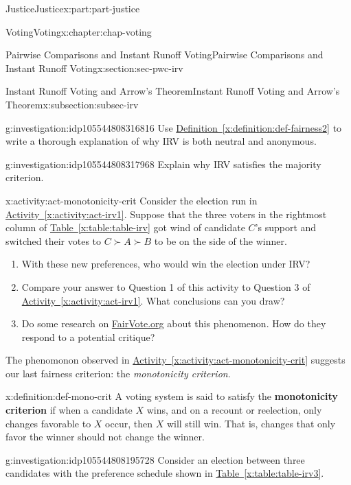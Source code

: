 \documentclass[oneside,10pt,]{book}
\newcommand{\xreffont}{\relax}
\newcommand{\terminology}[1]{\textbf{#1}}
\numberwithin{equation}{section}
\begin{document}
\begin{partptx}{Justice}{}{Justice}{}{}{x:part:part-justice}
\begin{chapterptx}{Voting}{}{Voting}{}{}{x:chapter:chap-voting}
\begin{sectionptx}{Pairwise Comparisons and Instant Runoff Voting}{}{Pairwise Comparisons and Instant Runoff Voting}{}{}{x:section:sec-pwc-irv}
\begin{subsectionptx}{Instant Runoff Voting and Arrow's Theorem}{}{Instant Runoff Voting and Arrow's Theorem}{}{}{x:subsection:subsec-irv}
\begin{investigation}{}{g:investigation:idp105544808316816}
Use \hyperref[x:definition:def-fairness2]{Definition~{\xreffont\ref{x:definition:def-fairness2}}} to write a thorough explanation of why IRV is both neutral and anonymous.%
\end{investigation}%
\begin{investigation}{}{g:investigation:idp105544808317968}%
Explain why IRV satisfies the majority criterion.%
\end{investigation}%
\begin{activity}{}{x:activity:act-monotonicity-crit}%
Consider the election run in \hyperref[x:activity:act-irv1]{Activity~{\xreffont\ref{x:activity:act-irv1}}}. Suppose that the three voters in the rightmost column of \hyperref[x:table:table-irv]{Table~{\xreffont\ref{x:table:table-irv}}} got wind of candidate \(C\)'s support and switched their votes to \(C \succ A \succ B\) to be on the side of the winner.%
%
\begin{enumerate}
\item{}With these new preferences, who would win the election under IRV?%
\item{}Compare your answer to Question 1 of this activity to Question 3 of \hyperref[x:activity:act-irv1]{Activity~{\xreffont\ref{x:activity:act-irv1}}}. What conclusions can you draw?%
\item{}Do some research on \href{https://www.fairvote.org}{FairVote.org}\footnotemark{} about this phenomenon. How do they respond to a potential critique?%
\end{enumerate}
\end{activity}%
%
The phenomonon observed in \hyperref[x:activity:act-monotonicity-crit]{Activity~{\xreffont\ref{x:activity:act-monotonicity-crit}}} suggests our last fairness criterion: the \emph{monotonicity criterion}.%
\begin{definition}{}{x:definition:def-mono-crit}%
%
A voting system is said to satisfy the \terminology{monotonicity criterion} if when a candidate \(X\) wins, and on a recount or reelection, only changes favorable to \(X\) occur, then \(X\) will still win. That is, changes that only favor the winner should not change the winner.%
\end{definition}
\begin{investigation}{}{g:investigation:idp105544808195728}%
Consider an election between three candidates with the preference schedule shown in \hyperref[x:table:table-irv3]{Table~{\xreffont\ref{x:table:table-irv3}}}.%

\end{investigation}
\end{subsectionptx}
\end{sectionptx}
\end{chapterptx}
\end{partptx}
\end{document}
